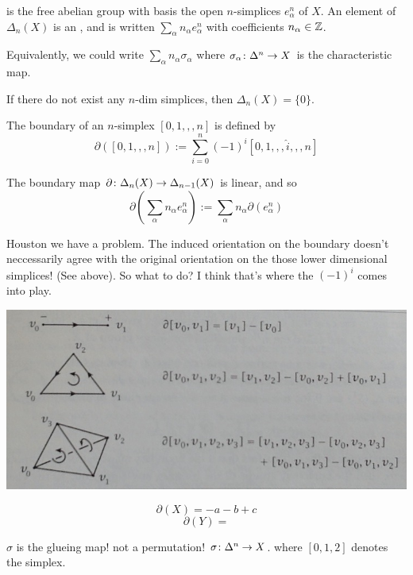 \documentclass[11pt,leqno,oneside]{amsart}
\numberwithin{thm}{section}
\renewcommand{\d}{\partial}
\begin{document}
\begin{defn}
    is the free abelian
  group with basis the open $n$-simplices $e_\alpha^n$ of $X$.  An
  element of $\Delta_n(X)$ is an , and is written
  $\sum_\alpha n_\alpha e_\alpha^n$ with coefficients
  $n_\alpha \in {\mathbb Z}$.
\end{defn}
\begin{rmk}
  Equivalently, we could write $\sum_\alpha n_\alpha \sigma_\alpha$
  where $\sigma_\alpha \colon \Delta^n \to X$ is the characteristic
  map.

  If there do not exist any $n$-dim simplices, then
  $\Delta_n(X) = \{0\}$.
\end{rmk}

\begin{defn}
  The boundary of an $n$-simplex $[0, 1,,, n]$ is defined by
  $$\d([0, 1,,, n]) := \sum_{i=0}^n (-1)^i [0, 1,,, \hat{i},,, n]$$
\end{defn}
\begin{defn}
  The boundary map $\d \from \Delta_n(X) \to \Delta_{n-1}(X)$ is
  linear, and so
  $$\d(\sum_\alpha n_\alpha e_\alpha^n) := \sum_\alpha n_\alpha
  \d(e_\alpha^n)$$
\end{defn}

Houston we have a problem.  The induced orientation on the boundary
doesn't neccessarily agree with the original orientation on the those
lower dimensional simplices!  (See above).  So what to do?  I think
that's where the $(-1)^i$ comes into play.

\begin{example}[Hatcher, p.105]
  \quad

  \includegraphics[scale=0.5]{images/boundary-of-oriented-simplex}
\end{example}

\begin{example}
  $$\d(X) = - a - b + c$$
  $$\d(Y) =$$

  $\sigma$ is the glueing map!  not a permutation!
  $\sigma \colon \Delta^n \to X$.  where $[0, 1, 2]$ denotes the
  simplex.
\end{example}
\end{document}

